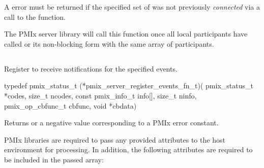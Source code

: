 \advicermstart
A  error must be returned if the specified set of  was not previously \textit{connected} via a call to the  function.

The \ac{PMIx} server library will
call this function once all local participants have called  or its non-blocking form with the same array of participants.

\advicermend


\subsection{}

\summary

Register to receive notifications for the specified events.

\format

\cspecificstart
\begin{codepar}
 typedef pmix_status_t (*pmix_server_register_events_fn_t)(
                              pmix_status_t *codes,
                              size_t ncodes,
                              const pmix_info_t info[],
                              size_t ninfo,
                              pmix_op_cbfunc_t cbfunc,
                              void *cbdata)
\end{codepar}
\cspecificend

\begin{arglist}
\end{arglist}

Returns  or a negative value corresponding to a PMIx error constant.

\reqattrstart
\ac{PMIx} libraries are required to pass any provided attributes to the host environment for processing. In addition, the following attributes are required to be included in the passed  array:


